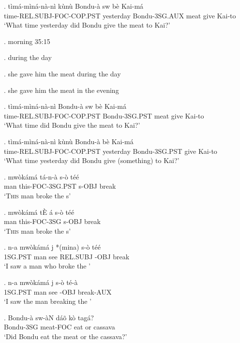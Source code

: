 \documentclass{assets/fieldnotes}
\begin{document}
\exg. tìmá-mìná-nà-nì kùnù Bondu-à sw bè Kai-má\\
time-REL.SUBJ-FOC-COP.PST yesterday Bondu-3SG.AUX meat give Kai-to\\
`What time yesterday did Bondu give the meat to Kai?'

\ex. morning   35:15

\ex. during the day

\ex. she gave him the meat during the day

\ex. she gave him the meat in the evening 

\exg. tìmá-mìná-nà-nì Bondu-à sw bè Kai-má\\
time-REL.SUBJ-FOC-COP.PST Bondu-3SG.PST meat give Kai-to\\
`What time did Bondu give the meat to Kai?'


\exg. tìmá-mìná-nà-nì kùnù Bondu-à bè Kai-má\\
time-REL.SUBJ-FOC-COP.PST yesterday Bondu-3SG.PST give Kai-to\\
`What time yesterday did Bondu give (something) to Kai?'

\exg. mwòkámá tá-n-à s-ò téé\\
man this-FOC-3SG.PST s-OBJ break\\
`\textsc{This} man broke the s'

\exg. mwòkámá t\`E á s-ò téé\\
man this-FOC-3SG s-OBJ break\\
`\textsc{This} man broke the s'

\exg. n-a mwòkámá j *(mina) s-ò téé\\
1SG.PST man see REL.SUBJ -OBJ break\\
`I saw a man who broke the '

\exg. n-a mwòkámá j s-ò té-à\\
1SG.PST man see -OBJ break-AUX\\
`I saw the man breaking the '

\exg. Bondu-à sw-àN dáõ kò tagá?\\
Bondu-3SG meat-FOC eat or cassava\\
`Did Bondu eat the meat or the cassava?'
\end{document}
